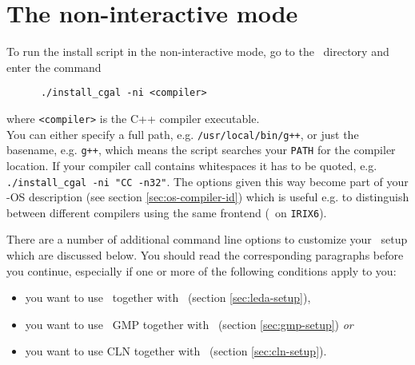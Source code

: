 
\section{The non-interactive mode}\label{sec:non-interactive}

To run the install script in the non-interactive mode, go to the
\cgaldir\ directory and enter the command
\begin{verbatim}
      ./install_cgal -ni <compiler>
\end{verbatim}
where \texttt{<compiler>} is the C++ compiler
executable.\\ You can either specify a full
path, e.g. \texttt{/usr/local/bin/g++}, or just the basename, e.g.
\texttt{g++}, which means the script searches your \texttt{PATH} for
the compiler location. If your compiler call contains whitespaces it
has to be quoted, e.g.  \texttt{./install\_cgal -ni "CC -n32"}.  The
options given this way become part of your \cgal-OS
description (see section
\ref{sec:os-compiler-id}) which is useful e.g. to distinguish between
different compilers using the same frontend (\mipsprocc\ on
\texttt{IRIX6}).

There are a number of additional command line options to customize
your \cgal\ setup which are discussed below. You should read the
corresponding paragraphs before you continue, especially if one or
more of the following conditions apply to you:
\begin{itemize}
\item you want to use \leda\ together with \cgal\ (section
  \ref{sec:leda-setup}),
\item you want to use \gnu\ GMP together with \cgal\ (section
  \ref{sec:gmp-setup}) \textit{or}
\item you want to use CLN together with \cgal\ (section
  \ref{sec:cln-setup}).
\end{itemize}

